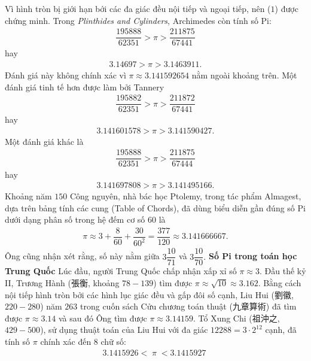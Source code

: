 \begin{multicols}{2}
	Vì hình tròn bị giới hạn bới các đa giác đều nội tiếp và ngoại tiếp, nên ($1$) được chứng minh.
	Trong \textit{Plinthides and Cylinders}, Archimedes còn tính số Pi: 
	\begin{align*}
		\dfrac{{195888}}{{62351}} > \pi  > \dfrac{{211875}}{{67441}}
	\end{align*}
	hay 
	\begin{align*}
		3.14697 > \pi  > 3.1463911.
	\end{align*}
	Đánh giá này không chính xác vì $\pi  \approx 3.141592654$   nằm ngoài khoảng trên. 
	Một đánh giá tinh tế hơn được làm bởi Tannery 
	\begin{align*}
		\dfrac{{195882}}{{62351}} > \pi  > \dfrac{{211872}}{{67441}}
	\end{align*}
	hay 
	\begin{align*}
		3.141601578 > \pi  > 3.141590427.
	\end{align*}
	Một đánh giá khác là 
	\begin{align*}
		\dfrac{{195888}}{{62351}} > \pi  > \dfrac{{211875}}{{67444}}
	\end{align*}
	hay 
	\begin{align*}
		3.141697808 > \pi  > 3.141495166.
	\end{align*}
	Khoảng năm $150$ Công nguyên, nhà bác học Ptolemy, trong tác phẩm Almagest, dựa trên bảng tính các cung (Table of Chords), đã dùng biểu diễn gần đúng số Pi dưới dạng phân số trong hệ đếm cơ số $60$ là 
	\begin{align*}
		\pi  \approx 3 + \dfrac{8}{{60}} + \dfrac{{30}}{{{{60}^2}}} = \dfrac{{377}}{{120}} \approx 3.141666667.
	\end{align*}
	Ông cũng nhận xét rằng, số này nằm giữa $3\dfrac{{10}}{{71}}$  và  $3\dfrac{{10}}{{70}}.$
	\vskip 0.1cm
	\textbf{\color{lichsutoanhoc}Số Pi trong toán học Trung Quốc}
	\vskip 0.1cm
	Lúc đầu, người Trung Quốc chấp nhận xấp xỉ số $\pi \approx 3$. Đầu thế kỷ II, Trương Hành (張衡, khoảng $78-139$) tìm được  $\pi  \approx \sqrt {10}  \approx 3.162$. Bằng cách nội tiếp hình tròn bởi các hình lục giác đều và gấp đôi số cạnh, Liu Hui (劉徽, $220-280$) năm $263$ trong cuốn sách Cửu chương toán thuật (九章算術) đã tìm được $\pi  \approx 3.14$  và sau đó Ông tìm được  $\pi  \approx 3.14159.$ Tổ Xung Chi (祖沖之, $429-500$), sử dụng thuật toán của Liu Hui với đa giác $12288 = 3 \cdot {2^{12}}$  cạnh, đã tính số $\pi$  chính xác đến $8$ chữ số:
	\begin{align*}
		3.1415926 < \;\pi \; < 3.1415927\;
	\end{align*}

\end{multicols}
